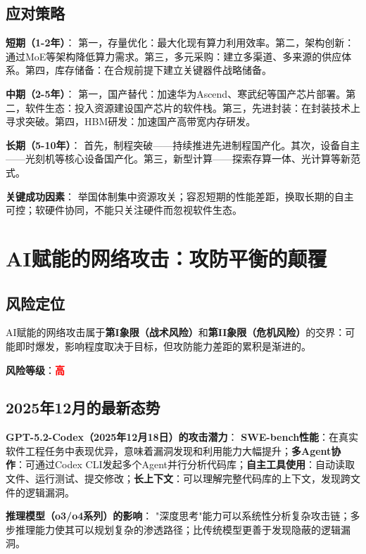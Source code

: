 \subsection{应对策略}

\textbf{短期（1-2年）}：
第一，存量优化：最大化现有算力利用效率。第二，架构创新：通过MoE等架构降低算力需求。第三，多元采购：建立多渠道、多来源的供应体系。第四，库存储备：在合规前提下建立关键器件战略储备。

\textbf{中期（2-5年）}：
第一，国产替代：加速华为Ascend、寒武纪等国产芯片部署。第二，软件生态：投入资源建设国产芯片的软件栈。第三，先进封装：在封装技术上寻求突破。第四，HBM研发：加速国产高带宽内存研发。

\textbf{长期（5-10年）}：
首先，制程突破——持续推进先进制程国产化。其次，设备自主——光刻机等核心设备国产化。第三，新型计算——探索存算一体、光计算等新范式。

\textbf{关键成功因素}：
举国体制集中资源攻关；容忍短期的性能差距，换取长期的自主可控；软硬件协同，不能只关注硬件而忽视软件生态。

\section{AI赋能的网络攻击：攻防平衡的颠覆}

\subsection{风险定位}

AI赋能的网络攻击属于\textbf{第I象限（战术风险）}和\textbf{第II象限（危机风险）}的交界：可能即时爆发，影响程度取决于目标，但攻防能力差距的累积是渐进的。

\textbf{风险等级}：\textcolor{red}{\textbf{高}}

\subsection{2025年12月的最新态势}

\textbf{GPT-5.2-Codex（2025年12月18日）的攻击潜力}：
\textbf{SWE-bench性能}：在真实软件工程任务中表现优异，意味着漏洞发现和利用能力大幅提升；\textbf{多Agent协作}：可通过Codex CLI发起多个Agent并行分析代码库；\textbf{自主工具使用}：自动读取文件、运行测试、提交修改；\textbf{长上下文}：可以理解完整代码库的上下文，发现跨文件的逻辑漏洞。

\textbf{推理模型（o3/o4系列）的影响}：
"深度思考"能力可以系统性分析复杂攻击链；多步推理能力使其可以规划复杂的渗透路径；比传统模型更善于发现隐蔽的逻辑漏洞。

